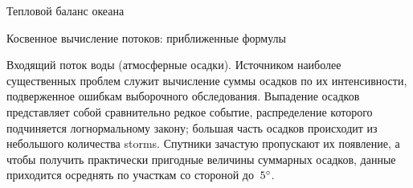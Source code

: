\begin{chapter}{Тепловой баланс океана}
\begin{section}{Косвенное вычисление потоков: приближенные формулы}
\begin{paragraph}{Входящий поток воды (атмосферные осадки).}
Источником наиболее существенных проблем служит вычисление суммы осадков 
по их интенсивности, подверженное ошибкам выборочного обследования.
Выпадение осадков представляет собой сравнительно редкое событие, 
распределение которого подчиняется логнормальному закону; большая часть
осадков происходит из небольшого количества storms.
Спутники зачастую пропускают их появление, а чтобы получить практически
пригодные величины суммарных осадков, данные приходится осреднять по участкам
со стороной до~${5}^\circ$.
%


\end{paragraph}
\end{section}
\end{chapter}

